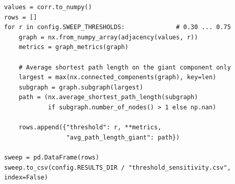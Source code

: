 \begin{lstlisting}[style=python]
values = corr.to_numpy()
rows = []
for r in config.SWEEP_THRESHOLDS:              # 0.30 ... 0.75
    graph = nx.from_numpy_array(adjacency(values, r))
    metrics = graph_metrics(graph)

    # Average shortest path length on the giant component only
    largest = max(nx.connected_components(graph), key=len)
    subgraph = graph.subgraph(largest)
    path = (nx.average_shortest_path_length(subgraph)
            if subgraph.number_of_nodes() > 1 else np.nan)

    rows.append({"threshold": r, **metrics,
                 "avg_path_length_giant": path})

sweep = pd.DataFrame(rows)
sweep.to_csv(config.RESULTS_DIR / "threshold_sensitivity.csv", index=False)
\end{lstlisting}
